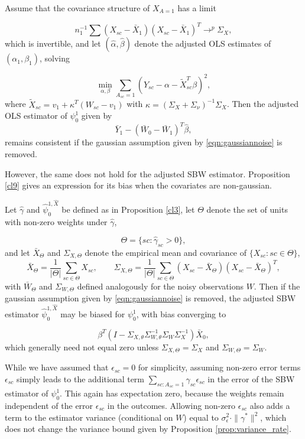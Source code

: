 \begin{proposition}\label{cl8}
Assume that the covariance structure of $X_{A=1}$ has a limit
    
    \[n_1^{-1}\sum (X_{sc} - \bar{X}_1) (X_{sc} - \bar{X}_1)^T \to^p \Sigma_X,\] 
which is invertible, and let $(\hat{\alpha}, \hat{\beta})$ denote the adjusted OLS estimates of $(\alpha_1, \beta_1)$, solving

\[ \min_{\alpha,\beta} \sum_{A_{sc}=1} (Y_{sc} - \alpha - \tilde{X}_{sc}^T \beta)^2, \]
where $\tilde{X}_{sc} = v_1 + \kappa^T(W_{sc} - v_1)$ with $\kappa = (\Sigma_X + \Sigma_\nu)^{-1}\Sigma_X$. Then the adjusted OLS estimator of $\psi_0^1$ given by
\[ \bar{Y}_1 - (\bar{W}_0 - \bar{W}_1)^T \hat{\beta},\]
remains consistent if the gaussian assumption given by \eqref{eqn:gaussiannoise} is removed.
\end{proposition}

However, the same does not hold for the adjusted SBW estimator. Proposition \ref{cl9} gives an expression for its bias when the covariates are non-gaussian.

\begin{proposition}\label{cl9}
Let $\hat{\gamma}$ and $\hat{\psi}_0^{1, \hat{X}}$ be defined as in Proposition \ref{cl3}, let $\Theta$ denote the set of units with non-zero weights under $\hat{\gamma}$,

\[ \Theta = \{sc: \hat{\gamma}_{sc} > 0\}, \]
and let $\bar{X}_\Theta$ and $\Sigma_{X,\Theta}$ denote the empirical mean and covariance of $\{X_{sc}:sc \in \Theta\}$,
\[ \bar{X}_\Theta = \frac{1}{|\Theta|}\sum_{sc \in \Theta} X_{sc},\qquad \Sigma_{X,\Theta} = \frac{1}{|\Theta|} \sum_{sc \in \Theta} (X_{sc} - \bar{X}_\Theta)(X_{sc} - \bar{X}_\Theta)^T,\]
with $\bar{W}_\Theta$ and $\Sigma_{W,\Theta}$ defined analogously for the noisy observations $W$. Then if the gaussian assumption given by \eqref{eqn:gaussiannoise} is removed, the adjusted SBW estimator $\hat{\psi}_0^{1,\hat{X}}$ may be biased for $\psi_0^1$, with bias converging to

\[ \beta^T(I -  \Sigma_{X,\theta}\Sigma_{W,\theta}^{-1} \Sigma_W \Sigma_X^{-1}) \bar{X}_0,\]
which generally need not equal zero unless $\Sigma_{X,\Theta} = \Sigma_X$ and $\Sigma_{W,\Theta} = \Sigma_W$.
\end{proposition}

\begin{remark}
    While we have assumed that $\epsilon_{sc}=0$ for simplicity, assuming non-zero error terms $\epsilon_{sc}$ simply leads to the additional term $\sum_{sc: A_{sc} = 1}\gamma_{sc}\epsilon_{sc}$ in the error of the SBW estimator of $\psi_0^1$. This again has expectation zero, because the weights remain independent of the error $\epsilon_{sc}$ in the outcomes. Allowing non-zero $\epsilon_{sc}$ also adds a term to the estimator variance (conditional on $W$) equal to $\sigma^2_{\epsilon}\cdot \|\gamma^*\|^2$,    which does not change the variance bound given by Proposition \ref{prop:variance_rate}.
\end{remark}


